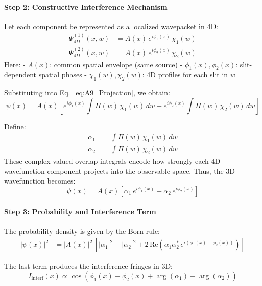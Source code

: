 \documentclass[12pt]{article}
\begin{document}
\paragraph{Step 2: Constructive Interference Mechanism}

Let each component be represented as a localized wavepacket in 4D:
\begin{align}
\Psi_{4D}^{(1)}(x, w) &= A(x)\, e^{i\phi_1(x)}\, \chi_1(w) \label{eq:A9_psi1} \\
\Psi_{4D}^{(2)}(x, w) &= A(x)\, e^{i\phi_2(x)}\, \chi_2(w) \label{eq:A9_psi2}
\end{align}
Here:
- \(A(x)\): common spatial envelope (same source)
- \(\phi_1(x), \phi_2(x)\): slit-dependent spatial phases  
- \(\chi_1(w), \chi_2(w)\): 4D profiles for each slit in \(w\)

Substituting into Eq.~\eqref{eq:A9_Projection}, we obtain:
\begin{equation}
\psi(x) = A(x)\left[ e^{i\phi_1(x)} \int \Pi(w)\, \chi_1(w)\, dw
+ e^{i\phi_2(x)} \int \Pi(w)\, \chi_2(w)\, dw \right]
\label{eq:A9_psiResult}
\end{equation}

Define:
\begin{align}
\alpha_1 &= \int \Pi(w)\, \chi_1(w)\, dw \\
\alpha_2 &= \int \Pi(w)\, \chi_2(w)\, dw
\end{align}
These complex-valued overlap integrals encode how strongly each 4D wavefunction component projects into the observable space. Thus, the 3D wavefunction becomes:
\begin{equation}
\psi(x) = A(x) \left[ \alpha_1\, e^{i\phi_1(x)} + \alpha_2\, e^{i\phi_2(x)} \right]
\label{eq:A9_finalPsi}
\end{equation}

\paragraph{Step 3: Probability and Interference Term}

The probability density is given by the Born rule:
\begin{align}
|\psi(x)|^2 &= |A(x)|^2\, \left[ |\alpha_1|^2 + |\alpha_2|^2 + 2\, \text{Re} \left( \alpha_1 \alpha_2^*\, e^{i(\phi_1(x) - \phi_2(x))} \right) \right]
\label{eq:A9_Probability}
\end{align}

The last term produces the interference fringes in 3D:
\begin{equation}
I_{\text{interf}}(x) \propto \cos\left( \phi_1(x) - \phi_2(x) + \arg(\alpha_1) - \arg(\alpha_2) \right)
\end{equation}
\end{document}
